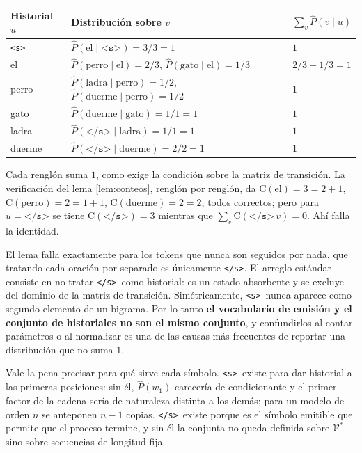 \documentclass[11pt,letterpaper]{article}
\newcommand{\Count}{\mathrm{C}}
\newcommand{\Vocab}{\mathcal{V}}
\newcommand{\bos}{\texttt{<s>}}
\newcommand{\eos}{\texttt{</s>}}
\begin{document}
\begin{center}
\begin{tabular}{lll}
\toprule
Historial $u$ & Distribución sobre $v$ & $\sum_v \hat P(v\mid u)$\\
\midrule
\bos    & $\hat P(\text{el}\mid \bos)=3/3=1$ & $1$\\
el      & $\hat P(\text{perro}\mid\text{el})=2/3$, \quad $\hat
P(\text{gato}\mid\text{el})=1/3$ & $2/3+1/3=1$\\
perro   & $\hat P(\text{ladra}\mid\text{perro})=1/2$, \quad $\hat
P(\text{duerme}\mid\text{perro})=1/2$ & $1$\\
gato    & $\hat P(\text{duerme}\mid\text{gato})=1/1=1$ & $1$\\
ladra   & $\hat P(\eos\mid\text{ladra})=1/1=1$ & $1$\\
duerme  & $\hat P(\eos\mid\text{duerme})=2/2=1$ & $1$\\
\bottomrule
\end{tabular}
\end{center}

Cada renglón suma $1$, como exige la condición sobre la matriz de transición. La
verificación del lema \ref{lem:conteos}, renglón por renglón, da
$\Count(\text{el})=3=2+1$, $\Count(\text{perro})=2=1+1$,
$\Count(\text{duerme})=2=2$, todos correctos; pero para $u=\eos$ se tiene
$\Count(\eos)=3$ mientras que $\sum_v \Count(\eos\,v)=0$. Ahí falla la
identidad.

\begin{idea}[title={Los símbolos de frontera son asimétricos}]
El lema falla exactamente para los tokens que nunca son seguidos por nada, que
tratando cada oración por separado es únicamente \eos. El arreglo estándar
consiste en no tratar \eos\ como historial: es un estado absorbente y se excluye
del dominio de la matriz de transición. Simétricamente, \bos\ nunca aparece como
segundo elemento de un bigrama. Por lo tanto \textbf{el vocabulario de emisión y
el conjunto de historiales no son el mismo conjunto}, y confundirlos al contar
parámetros o al normalizar es una de las causas más frecuentes de reportar una
distribución que no suma $1$.
\end{idea}

Vale la pena precisar para qué sirve cada símbolo. \bos\ existe para dar
historial a las primeras posiciones: sin él, $\hat P(w_1)$ carecería de
condicionante y el primer factor de la cadena sería de naturaleza distinta a los
demás; para un modelo de orden $n$ se anteponen $n-1$ copias. \eos\ existe
porque es el símbolo emitible que permite que el proceso termine, y sin él la
conjunta no queda definida sobre $\Vocab^*$ sino sobre secuencias de longitud
fija.
\end{document}
